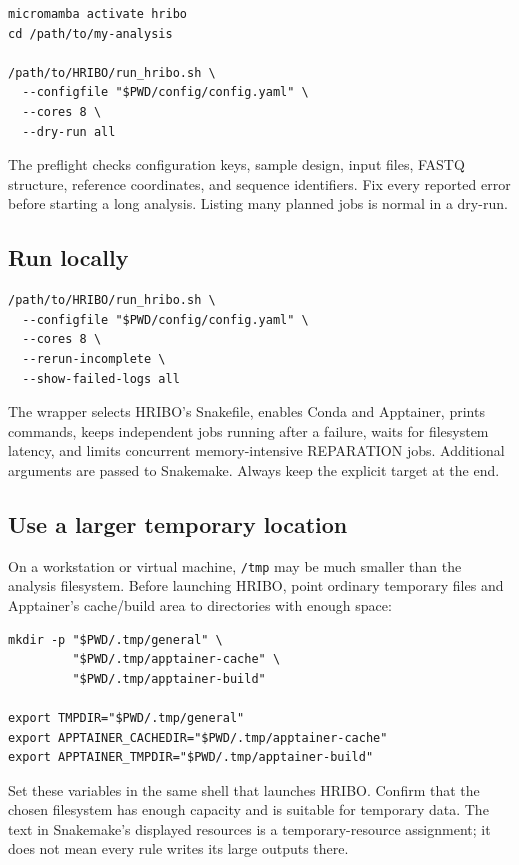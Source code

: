 \documentclass[11pt,a4paper]{article}
\newcommand{\setting}[1]{\texttt{\detokenize{#1}}}
\newcommand{\file}[1]{\nolinkurl{#1}}
\begin{document}
\begin{lstlisting}[style=hribo]
micromamba activate hribo
cd /path/to/my-analysis

/path/to/HRIBO/run_hribo.sh \
  --configfile "$PWD/config/config.yaml" \
  --cores 8 \
  --dry-run all
\end{lstlisting}

The preflight checks configuration keys, sample design, input files, FASTQ
structure, reference coordinates, and sequence identifiers. Fix every
reported error before starting a long analysis. Listing many planned jobs is
normal in a dry-run.

\subsection{Run locally}

\begin{lstlisting}[style=hribo]
/path/to/HRIBO/run_hribo.sh \
  --configfile "$PWD/config/config.yaml" \
  --cores 8 \
  --rerun-incomplete \
  --show-failed-logs all
\end{lstlisting}

The wrapper selects HRIBO's Snakefile, enables Conda and Apptainer, prints
commands, keeps independent jobs running after a failure, waits for filesystem
latency, and limits concurrent memory-intensive REPARATION jobs. Additional
arguments are passed to Snakemake. Always keep the explicit \setting{all}
target at the end.

\subsection{Use a larger temporary location}

On a workstation or virtual machine, \file{/tmp} may be much smaller than the
analysis filesystem. Before launching HRIBO, point ordinary temporary files
and Apptainer's cache/build area to directories with enough space:

\begin{lstlisting}[style=hribo]
mkdir -p "$PWD/.tmp/general" \
         "$PWD/.tmp/apptainer-cache" \
         "$PWD/.tmp/apptainer-build"

export TMPDIR="$PWD/.tmp/general"
export APPTAINER_CACHEDIR="$PWD/.tmp/apptainer-cache"
export APPTAINER_TMPDIR="$PWD/.tmp/apptainer-build"
\end{lstlisting}

Set these variables in the same shell that launches HRIBO. Confirm that the
chosen filesystem has enough capacity and is suitable for temporary data.
The \setting{tmpdir=/tmp} text in Snakemake's displayed resources is a
temporary-resource assignment; it does not mean every rule writes its large
outputs there.
\end{document}
